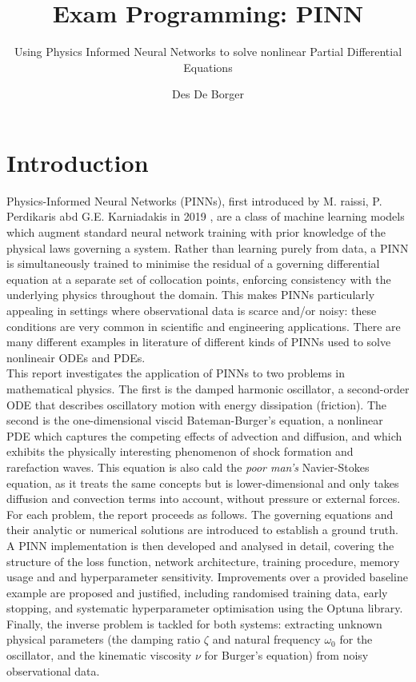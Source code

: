 \documentclass[we,twoside,openright,a4paper,11pt]{uantwerpenbamathesis}
\title{Exam Programming: PINN} %
\subtitle{Using Physics Informed Neural Networks to solve nonlinear Partial Differential Equations}
\author{Des De Borger}
\begin{document}
\maketitle

\frontmatter

\tableofcontents

\mainmatter

\chapter{Introduction}

Physics-Informed Neural Networks (PINNs), first introduced by M. raissi, P. Perdikaris abd G.E. Karniadakis in 2019 \cite{RAISSI2019686}, are a class of machine learning models which augment standard neural network training with prior knowledge of the physical laws governing a system. Rather than learning purely from data, a PINN is simultaneously trained to minimise the residual of a governing differential equation at a separate set of collocation points, enforcing consistency with the underlying physics throughout the domain. This makes PINNs particularly appealing in settings where observational data is scarce and/or noisy: these conditions are very common in scientific and engineering applications. There are many different examples in literature of different kinds of PINNs used to solve nonlineair ODEs and PDEs.\\

This report investigates the application of PINNs to two problems in mathematical physics. The first is the damped harmonic oscillator, a second-order ODE that describes oscillatory motion with energy dissipation (friction). The second is the one-dimensional viscid Bateman-Burger's equation, a nonlinear PDE which captures the competing effects of advection and diffusion, and which exhibits the physically interesting phenomenon of shock formation and rarefaction waves. This equation is also cald the \textit{poor man's} Navier-Stokes equation, as it treats the same concepts but is lower-dimensional and only takes diffusion and convection terms into account, without pressure or external forces.\\

For each problem, the report proceeds as follows. The governing equations and their analytic or numerical solutions are introduced to establish a ground truth. A PINN implementation is then developed and analysed in detail, covering the structure of the loss function, network architecture, training procedure, memory usage and and hyperparameter sensitivity. Improvements over a provided baseline example are proposed and justified, including randomised training data, early stopping, and systematic hyperparameter optimisation using the Optuna library. Finally, the inverse problem is tackled for both systems: extracting unknown physical parameters (the damping ratio $\zeta$ and natural frequency $\omega_0$ for the oscillator, and the kinematic viscosity $\nu$ for Burger's equation) from noisy observational data.\\
\end{document}
